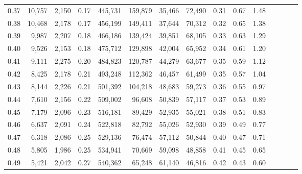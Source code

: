 \begin{tabular}{rrrcrrrrrrrrrrr}
0.37 &  10,757 &  2,150 &                                       0.17 &  445,731 &  159,879 &   35,466 &   72,490 &  0.31 &  0.67 &                         1.48 \\
0.38 &  10,468 &  2,178 &                                       0.17 &  456,199 &  149,411 &   37,644 &   70,312 &  0.32 &  0.65 &                         1.38 \\
0.39 &   9,987 &  2,207 &                                       0.18 &  466,186 &  139,424 &   39,851 &   68,105 &  0.33 &  0.63 &                         1.29 \\
0.40 &   9,526 &  2,153 &                                       0.18 &  475,712 &  129,898 &   42,004 &   65,952 &  0.34 &  0.61 &                         1.20 \\
0.41 &   9,111 &  2,275 &                                       0.20 &  484,823 &  120,787 &   44,279 &   63,677 &  0.35 &  0.59 &                         1.12 \\
0.42 &   8,425 &  2,178 &                                       0.21 &  493,248 &  112,362 &   46,457 &   61,499 &  0.35 &  0.57 &                         1.04 \\
0.43 &   8,144 &  2,226 &                                       0.21 &  501,392 &  104,218 &   48,683 &   59,273 &  0.36 &  0.55 &                         0.97 \\
0.44 &   7,610 &  2,156 &                                       0.22 &  509,002 &   96,608 &   50,839 &   57,117 &  0.37 &  0.53 &                         0.89 \\
0.45 &   7,179 &  2,096 &                                       0.23 &  516,181 &   89,429 &   52,935 &   55,021 &  0.38 &  0.51 &                         0.83 \\
0.46 &   6,637 &  2,091 &                                       0.24 &  522,818 &   82,792 &   55,026 &   52,930 &  0.39 &  0.49 &                         0.77 \\
0.47 &   6,318 &  2,086 &                                       0.25 &  529,136 &   76,474 &   57,112 &   50,844 &  0.40 &  0.47 &                         0.71 \\
0.48 &   5,805 &  1,986 &                                       0.25 &  534,941 &   70,669 &   59,098 &   48,858 &  0.41 &  0.45 &                         0.65 \\
0.49 &   5,421 &  2,042 &                                       0.27 &  540,362 &   65,248 &   61,140 &   46,816 &  0.42 &  0.43 &                         0.60 \\

\end{tabular}
